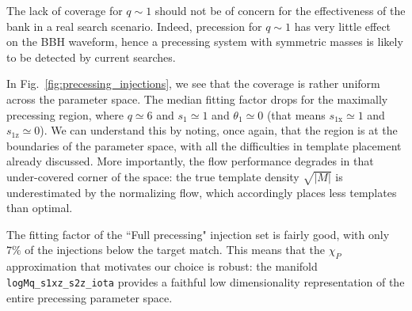 \documentclass[twocolumn,showpacs,preprintnumbers,nofootinbib,prd,
superscriptaddress,10pt]{revtex4-2}
\begin{document}
The lack of coverage for $q\sim 1$ should not be of concern for the effectiveness of the bank in a real search scenario. Indeed, precession for $q\sim 1$ has very little effect on the BBH waveform, hence a precessing system with symmetric masses is likely to be detected by current searches.

In Fig.~\ref{fig:precessing_injections}, we see that the coverage is rather uniform across the parameter space. The median fitting factor drops for the maximally precessing region, where $q \simeq 6$ and $s_1 \simeq 1$ and $\theta_1 \simeq 0$ (that means $s_\text{1x} \simeq 1$ and $s_\text{1z} \simeq 0$).
We can understand this by noting, once again, that the region is at the boundaries of the parameter space, with all the difficulties in template placement already discussed. More importantly, the flow performance degrades in that under-covered corner of the space: the true template density $\sqrt{|M|}$ is underestimated by the normalizing flow, which accordingly places less templates than optimal.

The fitting factor of the ``Full precessing" injection set is fairly good, with only $7\%$ of the injections below the target match. This means that the $\chi_P$ approximation that motivates our choice is robust: the manifold \texttt{logMq\_s1xz\_s2z\_iota} provides a faithful low dimensionality representation of the entire precessing parameter space.
\end{document}
